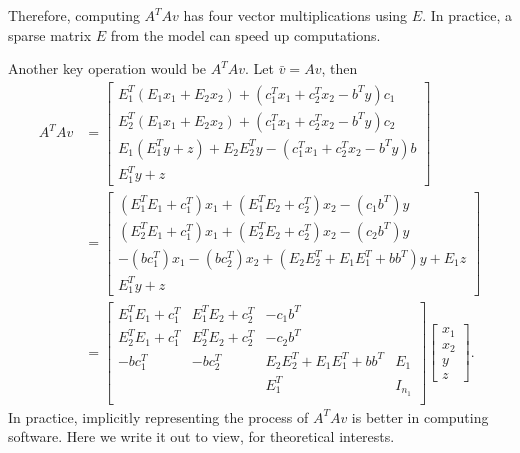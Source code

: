 \documentclass[12pt]{report}
\begin{document}
            Therefore, computing $A^TAv$ has four vector multiplications using $E$. 
            In practice, a sparse matrix $E$ from the model can speed up computations. 
            \par
            Another key operation would be $A^TAv$. 
            Let $\bar v = Av$, then 
            \begin{align*}
                A^TAv &= 
                \begin{bmatrix}
                    E^T_1(E_1x_1 + E_2x_2) + (c_1^Tx_1 + c_2^Tx_2 - b^Ty)c_1
                    \\
                    E^T_2(E_1x_1 + E_2x_2) + (c_1^Tx_1 + c_2^Tx_2 - b^Ty)c_2
                    \\
                    E_1(E_1^Ty + z) + E_2E_2^Ty - (c_1^Tx_1 + c_2^Tx_2 - b^Ty)b
                    \\
                    E_1^Ty + z
                \end{bmatrix}
                \\
                &= 
                \begin{bmatrix}
                    (E_1^TE_1 + c_1^T)x_1 + (E_1^TE_2 + c_2^T)x_2 - (c_1b^T)y
                    \\
                    (E_2^TE_1 + c_1^T)x_1 + (E_2^TE_2 + c_2^T)x_2 - (c_2b^T)y
                    \\
                    -(bc_1^T)x_1 - (bc_2^T)x_2 + (E_2E_2^T + E_1E_1^T + bb^T)y
                    + E_1z
                    \\
                    E_1^Ty + z
                \end{bmatrix}
                \\
                &= 
                \begin{bmatrix}
                    E_1^TE_1 + c_1^T & E_1^TE_2 + c_2^T & -c_1b^T & \\
                    E_2^TE_1 + c_1^T & E_2^TE_2 + c_2^T & -c_2b^T & \\
                    -bc_1^T& -bc_2^T & E_2E_2^T + E_1E_1^T + bb^T & E_1 \\
                    & & E_1^T & I_{n_1}\\
                \end{bmatrix}
                \begin{bmatrix}
                    x_1 \\ x_2 \\ y \\ z
                \end{bmatrix}. 
            \end{align*}
            In practice, implicitly representing the process of $A^TAv$ is better in computing software. 
            Here we write it out to view, for theoretical interests. 
\end{document}
